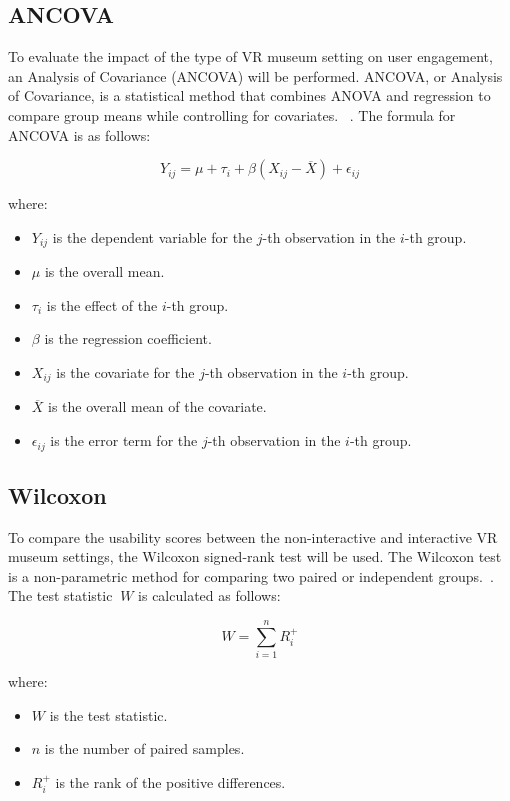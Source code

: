 \documentclass[conference]{IEEEtran}
\begin{document}
\subsection{ANCOVA}

To evaluate the impact of the type of VR museum setting on user engagement, an Analysis of Covariance (ANCOVA) will be performed. ANCOVA, or Analysis of Covariance, is a statistical method that combines ANOVA and regression to compare group means while controlling for covariates. ~\cite{goldberg2020anova}. The formula for ANCOVA is as follows:

\[ Y_{ij} = \mu + \tau_i + \beta(X_{ij} - \overline{X}) + \epsilon_{ij} \]

where:
\begin{itemize}
    \item \( Y_{ij} \) is the dependent variable for the \( j \)-th observation in the \( i \)-th group.
    \item \( \mu \) is the overall mean.
    \item \( \tau_i \) is the effect of the \( i \)-th group.
    \item \( \beta \) is the regression coefficient.
    \item \( X_{ij} \) is the covariate for the \( j \)-th observation in the \( i \)-th group.
    \item \( \overline{X} \) is the overall mean of the covariate.
    \item \( \epsilon_{ij} \) is the error term for the \( j \)-th observation in the \( i \)-th group.
\end{itemize}

\subsection{Wilcoxon}
To compare the usability scores between the non-interactive and interactive VR museum settings, the Wilcoxon signed-rank test will be used. The Wilcoxon test is a non-parametric method for comparing two paired or independent groups.~\cite{kishore2022statistics}. The test statistic \( \ W \) is calculated as follows:

\[
W = \sum_{i=1}^n R_i^+
\]

where:
\begin{itemize}
    \item \( W \) is the test statistic.
    \item \( n \) is the number of paired samples.
    \item \( R_i^+ \) is the rank of the positive differences.
\end{itemize}
\end{document}
